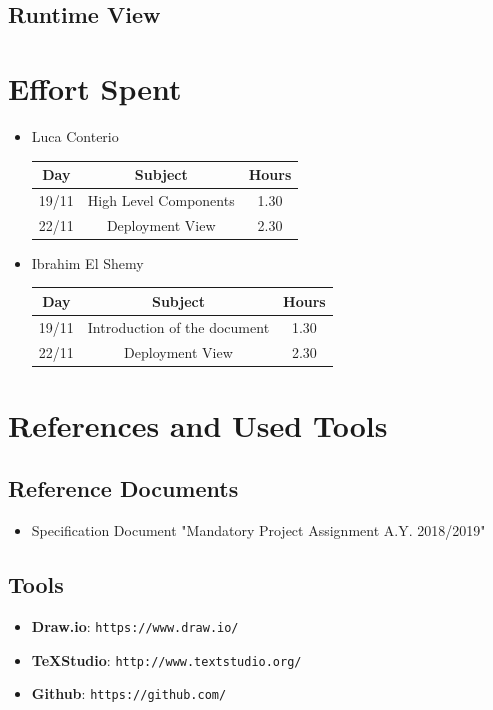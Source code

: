 \documentclass[12pt,a4paper]{article}
\begin{document}
	\newpage
	\subsection{Runtime View}
		



	\newpage
	\section{Effort Spent}
	\begin{itemize}
		\item Luca Conterio
		\begin{center}
			\begin{tabular}{| c | c | c |}
				\hline
				Day & Subject & Hours \\ \hline
				19/11 & High Level Components & 1.30 \\ \hline
				22/11 & Deployment View & 2.30 \\ \hline
			\end{tabular}
		\end{center}

		\item Ibrahim El Shemy
		\begin{center}
			\begin{tabular}{| c | c | c |}
				\hline
				Day & Subject & Hours \\ \hline
				19/11 & Introduction of the document & 1.30 \\ \hline
				22/11 & Deployment View & 2.30 \\ \hline
			\end{tabular}
		\end{center}
	\end{itemize}
	\section{References and Used Tools}
		\subsection{Reference Documents}
			\begin{itemize}
				\item Specification Document "Mandatory Project Assignment A.Y. 2018/2019"
			\end{itemize}
		\subsection{Tools}
			\begin{itemize}
				\item \textbf{Draw.io}: \texttt{https://www.draw.io/}
				\item \textbf{TeXStudio}: \texttt{http://www.textstudio.org/}
				\item \textbf{Github}: \texttt{https://github.com/}
			\end{itemize}
		
\end{document}
